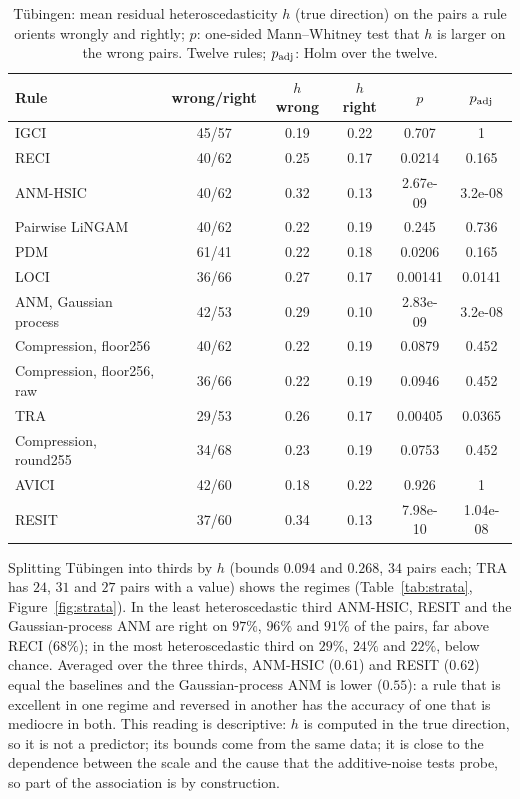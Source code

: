 \begin{table}[t]
\caption{T\"ubingen: mean residual heteroscedasticity $h$ (true direction) on the pairs a rule orients wrongly and rightly; $p$: one-sided Mann--Whitney test that $h$ is larger on the wrong pairs. Twelve rules; $p_{\rm adj}$: Holm over the twelve.}
\label{tab:h2}
\small
\begin{tabular}{@{}lccccc@{}}
\toprule
Rule & wrong/right & $h$ wrong & $h$ right & $p$ & $p_{\rm adj}$\\
\midrule
IGCI & 45/57 & 0.19 & 0.22 & 0.707 & 1\\
RECI & 40/62 & 0.25 & 0.17 & 0.0214 & 0.165\\
ANM-HSIC & 40/62 & 0.32 & 0.13 & 2.67e-09 & 3.2e-08\\
Pairwise LiNGAM & 40/62 & 0.22 & 0.19 & 0.245 & 0.736\\
PDM & 61/41 & 0.22 & 0.18 & 0.0206 & 0.165\\
LOCI & 36/66 & 0.27 & 0.17 & 0.00141 & 0.0141\\
ANM, Gaussian process & 42/53 & 0.29 & 0.10 & 2.83e-09 & 3.2e-08\\
Compression, floor256 & 40/62 & 0.22 & 0.19 & 0.0879 & 0.452\\
Compression, floor256, raw & 36/66 & 0.22 & 0.19 & 0.0946 & 0.452\\
TRA & 29/53 & 0.26 & 0.17 & 0.00405 & 0.0365\\
Compression, round255 & 34/68 & 0.23 & 0.19 & 0.0753 & 0.452\\
AVICI & 42/60 & 0.18 & 0.22 & 0.926 & 1\\
RESIT & 37/60 & 0.34 & 0.13 & 7.98e-10 & 1.04e-08\\
\bottomrule
\end{tabular}
\end{table}

Splitting T\"ubingen into thirds by $h$ (bounds $0.094$ and $0.268$, $34$ pairs each; TRA has $24$, $31$ and $27$ pairs with a value) shows the regimes (Table~\ref{tab:strata}, Figure~\ref{fig:strata}). In the least heteroscedastic third ANM-HSIC, RESIT and the Gaussian-process ANM are right on $97\%$, $96\%$ and $91\%$ of the pairs, far above RECI ($68\%$); in the most heteroscedastic third on $29\%$, $24\%$ and $22\%$, below chance. Averaged over the three thirds, ANM-HSIC ($0.61$) and RESIT ($0.62$) equal the baselines and the Gaussian-process ANM is lower ($0.55$): a rule that is excellent in one regime and reversed in another has the accuracy of one that is mediocre in both. This reading is descriptive: $h$ is computed in the true direction, so it is not a predictor; its bounds come from the same data; it is close to the dependence between the scale and the cause that the additive-noise tests probe, so part of the association is by construction.

